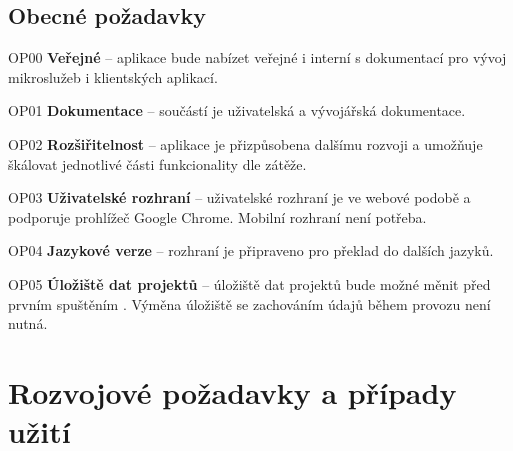 \subsection{Obecné požadavky}\label{subsec:spec-req-common}

\begin{dl}
   \item[OP00]
   \textbf{Veřejné } – aplikace bude nabízet veřejné i interní  s dokumentací pro vývoj mikroslužeb i klientských aplikací.

   \item[OP01]
   \textbf{Dokumentace} – součástí  je uživatelská a vývojářská dokumentace.

   \item[OP02]
   \textbf{Rozšiřitelnost} – aplikace je přizpůsobena dalšímu rozvoji a umožňuje škálovat jednotlivé části funkcionality dle zátěže.

   \item[OP03]
   \textbf{Uživatelské rozhraní} – uživatelské rozhraní je ve webové podobě a podporuje prohlížeč Google Chrome.
   Mobilní rozhraní není potřeba.

   \item[OP04]
   \textbf{Jazykové verze} – rozhraní je připraveno pro překlad do dalších jazyků.

   \item[OP05]
   \textbf{Úložiště dat projektů} – úložiště dat projektů bude možné měnit před prvním spuštěním .
   Výměna úložiště se zachováním údajů během provozu  není nutná.
\end{dl}


\clearpage



\section{Rozvojové požadavky a případy užití}\label{sec:optional-spec}


